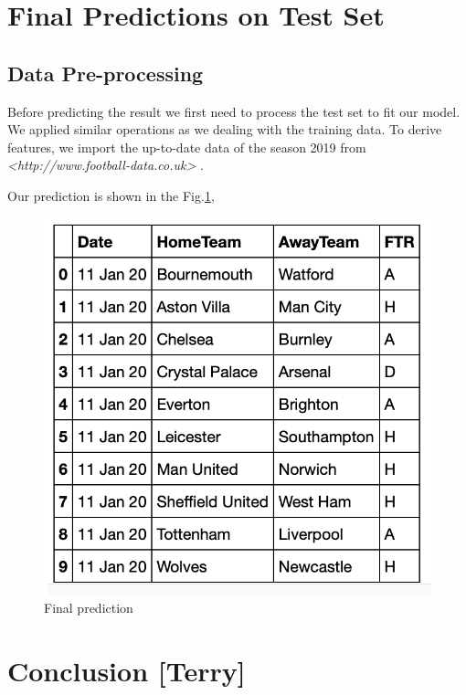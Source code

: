 \documentclass{article}
\begin{document}
\section{Final Predictions on Test Set}
\subsection{Data Pre-processing}

Before predicting the result we first need to process the test set to fit our model. We applied similar operations as we dealing with the training data. To derive features, we import the up-to-date data of the season 2019 from {\em<http://www.football-data.co.uk>} .

Our prediction is shown in the Fig.\ref{fig:finalPrediction},
\begin{figure}[ht]
\centering
\includegraphics[scale=0.5]{graphs/finalPrediction.png}
\caption{Final prediction}
\label{fig:finalPrediction}
\end{figure}

\section{Conclusion [Terry]}
\end{document}
